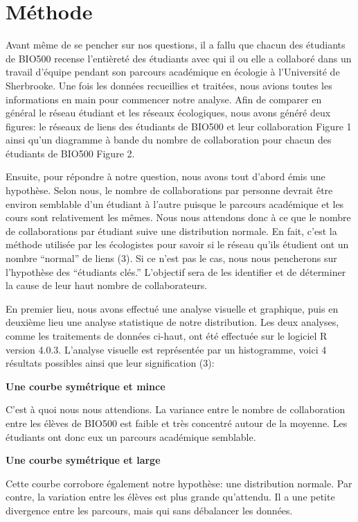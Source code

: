 \documentclass[9pt,twocolumn,twoside,]{pnas-new}
\begin{document}
\hypertarget{muxe9thode}{%
\section{Méthode}\label{muxe9thode}}

Avant même de se pencher sur nos questions, il a fallu que chacun des
étudiants de BIO500 recense l'entièreté des étudiants avec qui il ou
elle a collaboré dans un travail d'équipe pendant son parcours
académique en écologie à l'Université de Sherbrooke. Une fois les
données recueillies et traitées, nous avions toutes les informations en
main pour commencer notre analyse. Afin de comparer en général le réseau
étudiant et les réseaux écologiques, nous avons généré deux figures: le
réseaux de liens des étudiants de BIO500 et leur collaboration Figure 1
ainsi qu'un diagramme à bande du nombre de collaboration pour chacun des
étudiants de BIO500 Figure 2.

Ensuite, pour répondre à notre question, nous avons tout d'abord émis
une hypothèse. Selon nous, le nombre de collaborations par personne
devrait être environ semblable d'un étudiant à l'autre puisque le
parcours académique et les cours sont relativement les mêmes. Nous nous
attendons donc à ce que le nombre de collaborations par étudiant suive
une distribution normale. En fait, c'est la méthode utilisée par les
écologistes pour savoir si le réseau qu'ils étudient ont un nombre
``normal'' de liens (3). Si ce n'est pas le cas, nous nous pencherons
sur l'hypothèse des ``étudiants clés.'' L'objectif sera de les
identifier et de déterminer la cause de leur haut nombre de
collaborateurs.

En premier lieu, nous avons effectué une analyse visuelle et graphique,
puis en deuxième lieu une analyse statistique de notre distribution. Les
deux analyses, comme les traitements de données ci-haut, ont été
effectuée sur le logiciel R version 4.0.3. L'analyse visuelle est
représentée par un histogramme, voici 4 résultats possibles ainsi que
leur signification (3):

\textbf{Une courbe symétrique et mince}

C'est à quoi nous nous attendions. La variance entre le nombre de
collaboration entre les élèves de BIO500 est faible et très concentré
autour de la moyenne. Les étudiants ont donc eux un parcours académique
semblable.

\textbf{Une courbe symétrique et large}

Cette courbe corrobore également notre hypothèse: une distribution
normale. Par contre, la variation entre les élèves est plus grande
qu'attendu. Il a une petite divergence entre les parcours, mais qui sans
débalancer les données.
\end{document}
